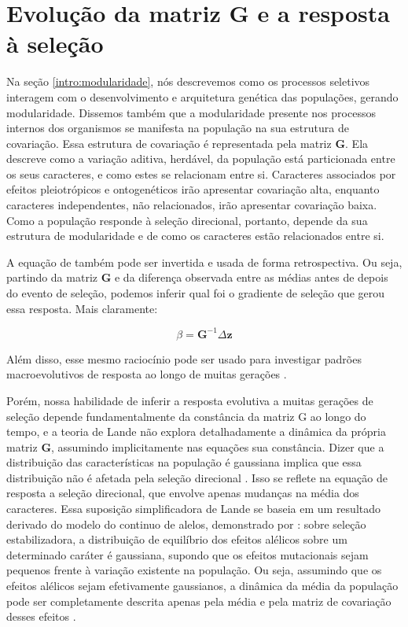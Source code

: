 \section{Evolução da matriz $\mathbf{G}$ e a resposta à seleção}\label{intro:matG}

Na seção \ref{intro:modularidade}, nós descrevemos como os processos
seletivos interagem com o desenvolvimento e arquitetura genética das
populações, gerando modularidade.
Dissemos também que a modularidade presente nos processos internos dos
organismos se manifesta na população na sua estrutura de covariação.
Essa estrutura de covariação é representada pela matriz $\mathbf{G}$.
Ela descreve como a variação aditiva, herdável, da população está particionada entre os
seus caracteres, e como estes se relacionam entre si.
Caracteres associados por efeitos pleiotrópicos e ontogenéticos irão
apresentar covariação alta, enquanto caracteres independentes, não
relacionados, irão apresentar covariação baixa.
Como a população responde à seleção direcional, portanto, depende da sua estrutura
de modularidade e de como os caracteres estão relacionados entre si.

A equação de \cite{Lande1979} também pode ser invertida e usada de forma
retrospectiva.
Ou seja, partindo da matriz $\mathbf{G}$ e da diferença observada entre
as médias antes de depois do evento de seleção, podemos inferir qual foi
o gradiente de seleção que gerou essa resposta.
Mais claramente:

\begin{equation}
    \beta = \mathbf{G}^{-1}\Delta \mathbf{z}
\end{equation}

Além disso, esse mesmo raciocínio pode ser usado para investigar padrões
macroevolutivos de resposta ao longo de muitas gerações
\citep[veja também a equação \ref{betatotal}]{Lande1983, Marroig2004, Marroig2005}.

Porém, nossa habilidade de inferir a resposta evolutiva a muitas
gerações de seleção depende fundamentalmente da constância da matriz G
ao longo do tempo, e a teoria de Lande não explora detalhadamente a
dinâmica da própria matriz $\mathbf{G}$, assumindo implicitamente nas
equações sua constância.
Dizer que a distribuição das características na população é gaussiana
implica que essa distribuição não é afetada pela seleção direcional
\citep{Barton1987}.
Isso se reflete na equação de resposta a seleção direcional, que envolve
apenas mudanças na média dos caracteres.
Essa suposição simplificadora de Lande se baseia em um resultado
derivado do modelo do continuo de alelos, demonstrado por
\cite{Kimura1965}: sobre seleção estabilizadora, a
distribuição de equilíbrio dos efeitos alélicos sobre um determinado
caráter é gaussiana, supondo que os efeitos mutacionais sejam pequenos
frente à variação existente na população.
Ou seja, assumindo que os efeitos alélicos sejam efetivamente
gaussianos, a dinâmica da média da população pode ser completamente
descrita apenas pela média e pela matriz de covariação desses efeitos
\citep{Barton1987}.

